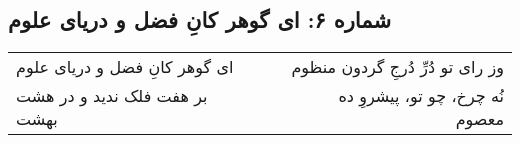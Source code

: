 \begin{center}
\section*{شماره ۶: ای گوهر کانِ فضل و دریای علوم}
\label{sec:006}
\begin{longtable}{l p{0.5cm} r}
ای گوهر کانِ فضل و دریای علوم
&&
وز رای تو دُرِّ دُرجِ گردون منظوم
\\
بر هفت فلک ندید و در هشت بهشت
&&
نُه چرخ، چو تو، پیشروِ ده معصوم
\\
\end{longtable}
\end{center}
